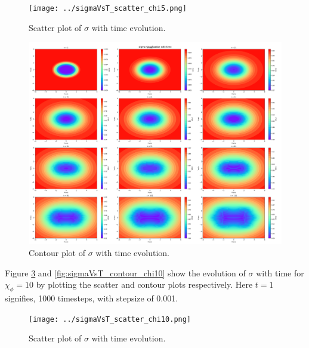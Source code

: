 \documentclass[12pt]{article}
\begin{document}
\begin{figure}
    \centering
    \texttt{[image: ../sigmaVsT\_scatter\_chi5.png]}
    \caption{Scatter plot of $\sigma$ with time evolution.}
    \label{fig:sigmaVsT_scatter_chi5}
\end{figure}
\begin{figure}
    \centering
    \includegraphics[width=1.0\textwidth]{../sigmaVsT_contour_chi5.png}
    \caption{Contour plot of $\sigma$ with time evolution.}
    \label{fig:sigmaVsT_contour_chi5}
\end{figure}
Figure \ref{fig:sigmaVsT_scatter_chi10} and \ref{fig:sigmaVsT_contour_chi10} show the evolution of $\sigma$ with time for $\chi_\phi=10$ by plotting the scatter and contour plots respectively. 
Here $t=1$ signifies, 1000 timesteps, with stepsize of 0.001.
\begin{figure}
    \centering
    \texttt{[image: ../sigmaVsT\_scatter\_chi10.png]}
    \caption{Scatter plot of $\sigma$ with time evolution.}
    \label{fig:sigmaVsT_scatter_chi10}
\end{figure}
\end{document}
